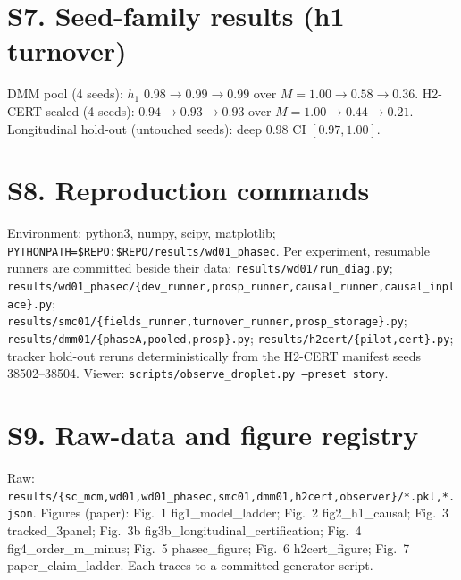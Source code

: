 \documentclass[11pt]{article}
\begin{document}
\section{S7. Seed-family results (h1 turnover)}
DMM pool (4 seeds): $h_1$ $0.98\to0.99\to0.99$ over $M=1.00\to0.58\to0.36$. H2-CERT sealed (4 seeds):
$0.94\to0.93\to0.93$ over $M=1.00\to0.44\to0.21$. Longitudinal hold-out (untouched seeds): deep $0.98$ CI $[0.97,1.00]$.

\section{S8. Reproduction commands}
Environment: python3, numpy, scipy, matplotlib; \texttt{PYTHONPATH=\$REPO:\$REPO/results/wd01\_phasec}.
Per experiment, resumable runners are committed beside their data:
\texttt{results/wd01/run\_diag.py}; \texttt{results/wd01\_phasec/\{dev\_runner,prosp\_runner,causal\_runner,causal\_inplace\}.py};
\texttt{results/smc01/\{fields\_runner,turnover\_runner,prosp\_storage\}.py};
\texttt{results/dmm01/\{phaseA,pooled,prosp\}.py}; \texttt{results/h2cert/\{pilot,cert\}.py};
tracker hold-out reruns deterministically from the H2-CERT manifest seeds 38502--38504. Viewer:
\texttt{scripts/observe\_droplet.py --preset story}.

\section{S9. Raw-data and figure registry}
Raw: \texttt{results/\{sc\_mcm,wd01,wd01\_phasec,smc01,dmm01,h2cert,observer\}/*.pkl,*.json}. Figures (paper):
Fig.~1 fig1\_model\_ladder; Fig.~2 fig2\_h1\_causal; Fig.~3 tracked\_3panel; Fig.~3b fig3b\_longitudinal\_certification;
Fig.~4 fig4\_order\_m\_minus; Fig.~5 phasec\_figure; Fig.~6 h2cert\_figure; Fig.~7 paper\_claim\_ladder. Each traces
to a committed generator script.
\end{document}
